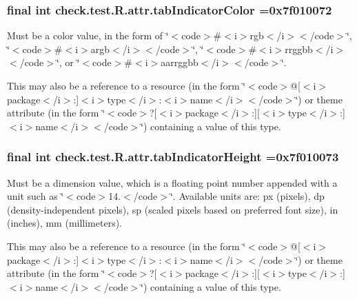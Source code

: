 \subsubsection[{tab\+Indicator\+Color}]{\setlength{\rightskip}{0pt plus 5cm}final int check.\+test.\+R.\+attr.\+tab\+Indicator\+Color =0x7f010072\hspace{0.3cm}{\ttfamily [static]}}\label{classcheck_1_1test_1_1_r_1_1attr_a7c3852dcc199564747fe365fccae05f5}
Must be a color value, in the form of \char`\"{}$<$code$>$\#$<$i$>$rgb$<$/i$>$$<$/code$>$\char`\"{}, \char`\"{}$<$code$>$\#$<$i$>$argb$<$/i$>$$<$/code$>$\char`\"{}, \char`\"{}$<$code$>$\#$<$i$>$rrggbb$<$/i$>$$<$/code$>$\char`\"{}, or \char`\"{}$<$code$>$\#$<$i$>$aarrggbb$<$/i$>$$<$/code$>$\char`\"{}. 

This may also be a reference to a resource (in the form \char`\"{}$<$code$>$@\mbox{[}$<$i$>$package$<$/i$>$\+:\mbox{]}$<$i$>$type$<$/i$>$\+:$<$i$>$name$<$/i$>$$<$/code$>$\char`\"{}) or theme attribute (in the form \char`\"{}$<$code$>$?\mbox{[}$<$i$>$package$<$/i$>$\+:\mbox{]}\mbox{[}$<$i$>$type$<$/i$>$\+:\mbox{]}$<$i$>$name$<$/i$>$$<$/code$>$\char`\"{}) containing a value of this type. \hypertarget{classcheck_1_1test_1_1_r_1_1attr_a274b66d412bade0510cae3077354f9be}{}
\subsubsection[{tab\+Indicator\+Height}]{\setlength{\rightskip}{0pt plus 5cm}final int check.\+test.\+R.\+attr.\+tab\+Indicator\+Height =0x7f010073\hspace{0.3cm}{\ttfamily [static]}}\label{classcheck_1_1test_1_1_r_1_1attr_a274b66d412bade0510cae3077354f9be}
Must be a dimension value, which is a floating point number appended with a unit such as \char`\"{}$<$code$>$14.\+5sp$<$/code$>$\char`\"{}. Available units are\+: px (pixels), dp (density-\/independent pixels), sp (scaled pixels based on preferred font size), in (inches), mm (millimeters). 

This may also be a reference to a resource (in the form \char`\"{}$<$code$>$@\mbox{[}$<$i$>$package$<$/i$>$\+:\mbox{]}$<$i$>$type$<$/i$>$\+:$<$i$>$name$<$/i$>$$<$/code$>$\char`\"{}) or theme attribute (in the form \char`\"{}$<$code$>$?\mbox{[}$<$i$>$package$<$/i$>$\+:\mbox{]}\mbox{[}$<$i$>$type$<$/i$>$\+:\mbox{]}$<$i$>$name$<$/i$>$$<$/code$>$\char`\"{}) containing a value of this type. \hypertarget{classcheck_1_1test_1_1_r_1_1attr_a4891fae4f27ae76a2dd289815ab27d96}{}
